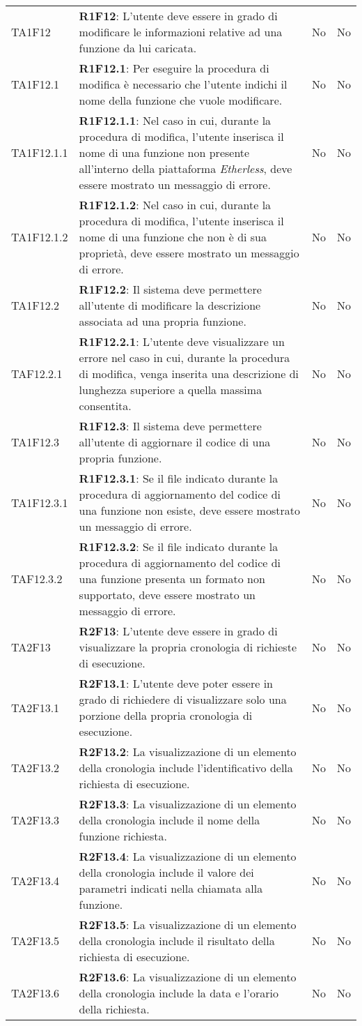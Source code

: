 \begin{longtable}{ 
		>{\centering}p{} 
		>{}p{} 
		>{\centering}p{}
		>{\centering}p{} }
	TA1F12 		& \textbf{R1F12}: L'utente deve essere in grado di modificare le informazioni relative ad una funzione da lui caricata. 																	& No & No \tabularnewline
	TA1F12.1 	& \textbf{R1F12.1}: Per eseguire la procedura di modifica è necessario che l'utente indichi il nome della funzione che vuole modificare. 													& No & No \tabularnewline
	TA1F12.1.1 	& \textbf{R1F12.1.1}: Nel caso in cui, durante la procedura di modifica, l'utente inserisca il nome di una funzione non presente all'interno della piattaforma \textit{Etherless}, deve essere mostrato un messaggio di errore.	& No & No \tabularnewline
	TA1F12.1.2 	& \textbf{R1F12.1.2}: Nel caso in cui, durante la procedura di modifica, l'utente inserisca il nome di una funzione che non è di sua proprietà, deve essere 	mostrato un messaggio di errore. & No & No \tabularnewline
	TA1F12.2 	& \textbf{R1F12.2}: Il sistema deve permettere all'utente di modificare la descrizione associata ad una propria funzione. 																	& No & No \tabularnewline
	TAF12.2.1 	& \textbf{R1F12.2.1}: L'utente deve visualizzare un errore nel caso in cui, durante la procedura di modifica, venga inserita una descrizione di lunghezza superiore a quella massima consentita. 	& No & No \tabularnewline
	TA1F12.3 	& \textbf{R1F12.3}: Il sistema deve permettere all'utente di aggiornare il codice di una propria funzione. 																				& No & No \tabularnewline
	TA1F12.3.1 	& \textbf{R1F12.3.1}: Se il file indicato durante la procedura di aggiornamento del codice di una funzione non esiste, deve essere mostrato un messaggio di errore.							& No & No \tabularnewline
	TAF12.3.2 	& \textbf{R1F12.3.2}: Se il file indicato durante la procedura di aggiornamento del codice di una funzione presenta un formato non supportato, deve essere mostrato un messaggio di errore.	& No & No \tabularnewline
	
	TA2F13 		& \textbf{R2F13}: L'utente deve essere in grado di visualizzare la propria cronologia di richieste di esecuzione. 																		& No & No \tabularnewline
	TA2F13.1 	& \textbf{R2F13.1}: L'utente deve poter essere in grado di richiedere di visualizzare solo una porzione della propria cronologia di esecuzione. 											& No & No \tabularnewline
	TA2F13.2 	& \textbf{R2F13.2}: La visualizzazione di un elemento della cronologia include l'identificativo della richiesta di esecuzione. 															& No & No \tabularnewline
	TA2F13.3 	& \textbf{R2F13.3}: La visualizzazione di un elemento della cronologia include il nome della funzione richiesta. 																			& No & No \tabularnewline		
	TA2F13.4 	& \textbf{R2F13.4}: La visualizzazione di un elemento della cronologia include il valore dei parametri indicati nella chiamata alla funzione.												& No & No \tabularnewline
	TA2F13.5 	& \textbf{R2F13.5}: La visualizzazione di un elemento della cronologia include il risultato della richiesta di esecuzione.																	& No & No \tabularnewline
	TA2F13.6 	& \textbf{R2F13.6}: La visualizzazione di un elemento della cronologia include la data e l'orario della richiesta. 																		& No & No \tabularnewline
	

\end{longtable}
